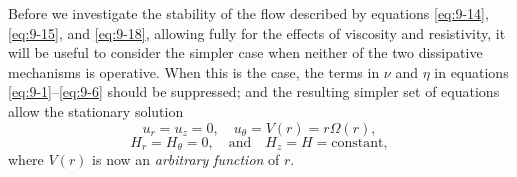 Before we investigate the stability of the flow described by equations \eqref{eq:9-14}, \eqref{eq:9-15}, and \eqref{eq:9-18}, allowing fully for the effects of viscosity and resistivity, it will be useful to consider the simpler case when neither of the two dissipative mechanisms is operative. When this is the case, the terms in $\nu$ and $\eta$ in equations \eqref{eq:9-1}--\eqref{eq:9-6} should be suppressed; and the resulting simpler set of equations allow the stationary solution
\begin{equation}
u_r = u_z = 0, \quad u_\theta = V(r) = r\Omega(r), \label{eq:9-21}
\end{equation}
\begin{equation}
H_r = H_\theta = 0, \quad \text{and} \quad H_z = H = \text{constant}, \label{eq:9-22}
\end{equation}
where $V(r)$ is now an \emph{arbitrary function} of $r$.

